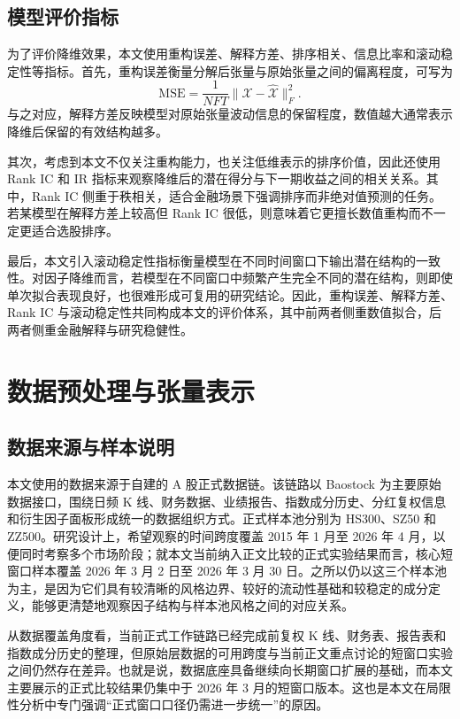 \section{模型评价指标}

为了评价降维效果，本文使用重构误差、解释方差、排序相关、信息比率和滚动稳定性等指标。首先，重构误差衡量分解后张量与原始张量之间的偏离程度，可写为
\begin{equation}
\mathrm{MSE}=\frac{1}{NFT}\|\mathcal{X}-\hat{\mathcal{X}}\|_F^2.
\end{equation}
与之对应，解释方差反映模型对原始张量波动信息的保留程度，数值越大通常表示降维后保留的有效结构越多。

其次，考虑到本文不仅关注重构能力，也关注低维表示的排序价值，因此还使用 Rank IC 和 IR 指标来观察降维后的潜在得分与下一期收益之间的相关关系。其中，Rank IC 侧重于秩相关，适合金融场景下强调排序而非绝对值预测的任务。若某模型在解释方差上较高但 Rank IC 很低，则意味着它更擅长数值重构而不一定更适合选股排序。

最后，本文引入滚动稳定性指标衡量模型在不同时间窗口下输出潜在结构的一致性。对因子降维而言，若模型在不同窗口中频繁产生完全不同的潜在结构，则即使单次拟合表现良好，也很难形成可复用的研究结论。因此，重构误差、解释方差、Rank IC 与滚动稳定性共同构成本文的评价体系，其中前两者侧重数值拟合，后两者侧重金融解释与研究稳健性。

\chapter{数据预处理与张量表示}

\section{数据来源与样本说明}

本文使用的数据来源于自建的 A 股正式数据链。该链路以 Baostock 为主要原始数据接口，围绕日频 K 线、财务数据、业绩报告、指数成分历史、分红复权信息和衍生因子面板形成统一的数据组织方式。正式样本池分别为 HS300、SZ50 和 ZZ500。研究设计上，希望观察的时间跨度覆盖 2015 年 1 月至 2026 年 4 月，以便同时考察多个市场阶段；就本文当前纳入正文比较的正式实验结果而言，核心短窗口样本覆盖 2026 年 3 月 2 日至 2026 年 3 月 30 日。之所以仍以这三个样本池为主，是因为它们具有较清晰的风格边界、较好的流动性基础和较稳定的成分定义，能够更清楚地观察因子结构与样本池风格之间的对应关系。

从数据覆盖角度看，当前正式工作链路已经完成前复权 K 线、财务表、报告表和指数成分历史的整理，但原始层数据的可用跨度与当前正文重点讨论的短窗口实验之间仍然存在差异。也就是说，数据底座具备继续向长期窗口扩展的基础，而本文主要展示的正式比较结果仍集中于 2026 年 3 月的短窗口版本。这也是本文在局限性分析中专门强调“正式窗口口径仍需进一步统一”的原因。

